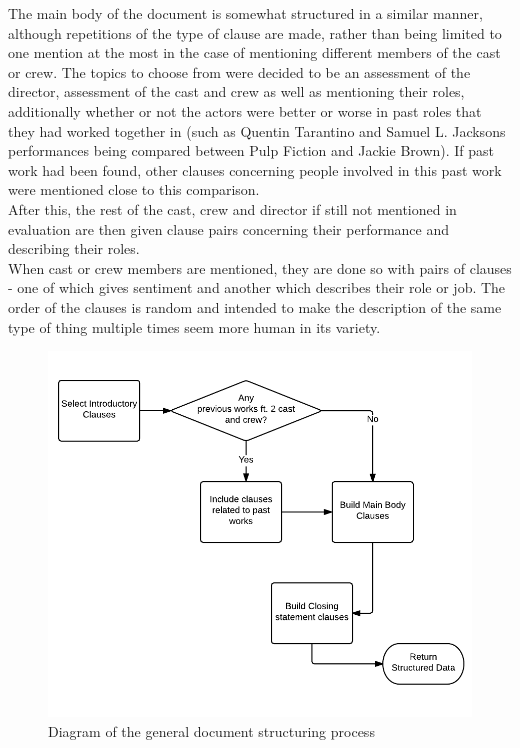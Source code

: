 The main body of the document is somewhat structured in a similar manner, although repetitions of the type of clause are made, rather than being limited to one mention at the most in the case of mentioning different members of the cast or crew. The topics to choose from were decided to be an assessment of the director, assessment of the cast and crew as well as mentioning their roles, additionally whether or not the actors were better or worse in past roles that they had worked together in (such as Quentin Tarantino and Samuel L. Jacksons performances being compared between Pulp Fiction and Jackie Brown). If past work had been found, other clauses concerning people involved in this past work were mentioned close to this comparison.\\
After this, the rest of the cast, crew and director if still not mentioned in evaluation are then given clause pairs concerning their performance and describing their roles.\\
When cast or crew members are mentioned, they are done so with pairs of clauses - one of which gives sentiment and another which describes their role or job. The order of the clauses is random and intended to make the description of the same type of thing multiple times seem more human in its variety.\\

\begin{figure}
\centering
\includegraphics[width=0.7\linewidth]{"figures/diagrams_etc/structure document"}
\caption{Diagram of the general document structuring process}
\label{fig:structure-document}
\end{figure}


